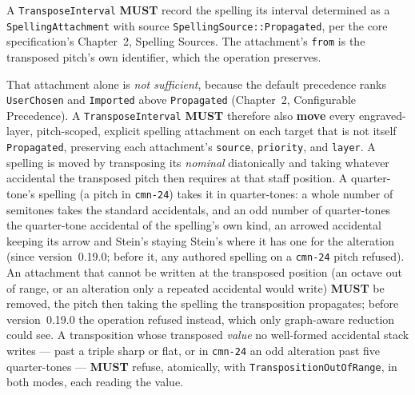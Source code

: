 \documentclass[11pt,letterpaper]{report}
\newcommand{\sectionsc}[1]{{\addfontfeatures{Letters=SmallCaps}#1}}
\newcounter{requirement}[chapter]
\newcommand{\MUST}{\textbf{MUST}}
\begin{document}
\begin{requirement}
  \label{req:opcat:transpose-interval-spelling}
  A \texttt{TransposeInterval} \MUST{} record the spelling its interval
  determined as a \texttt{SpellingAttachment} with source
  \texttt{SpellingSource::Propagated}, per the core specification's Chapter~2,
  \sectionsc{Spelling Sources}. The attachment's \texttt{from} is the
  transposed pitch's own identifier, which the operation preserves.

  That attachment alone is \emph{not sufficient}, because the default
  precedence ranks \texttt{UserChosen} and \texttt{Imported} above
  \texttt{Propagated} (Chapter~2, \sectionsc{Configurable Precedence}). A
  \texttt{TransposeInterval} \MUST{} therefore also \textbf{move} every
  engraved-layer, pitch-scoped, explicit spelling attachment on each target
  that is not itself \texttt{Propagated}, preserving each attachment's
  \texttt{source}, \texttt{priority}, and \texttt{layer}. A spelling is moved
  by transposing its \emph{nominal} diatonically and taking whatever accidental
  the transposed pitch then requires at that staff position. A quarter-tone's
  spelling (a pitch in \texttt{cmn-24}) takes it in quarter-tones: a whole
  number of semitones takes the standard accidentals, and an odd number of
  quarter-tones the quarter-tone accidental of the spelling's own kind, an
  arrowed accidental keeping its arrow and Stein's staying Stein's where it has
  one for the alteration (since version~0.19.0; before it, any authored
  spelling on a \texttt{cmn-24} pitch refused). An attachment that cannot be
  written at the transposed position (an octave out of range, or an
  alteration only a repeated accidental would write) \MUST{} be removed, the
  pitch then taking the spelling the transposition propagates; before
  version~0.19.0 the operation refused instead, which only graph-aware
  reduction could see. A transposition whose transposed \emph{value} no
  well-formed accidental stack writes --- past a triple sharp or flat, or in
  \texttt{cmn-24} an odd alteration past five quarter-tones --- \MUST{}
  refuse, atomically, with \texttt{TranspositionOutOfRange}, in both modes,
  each reading the value.
\end{requirement}
\end{document}
